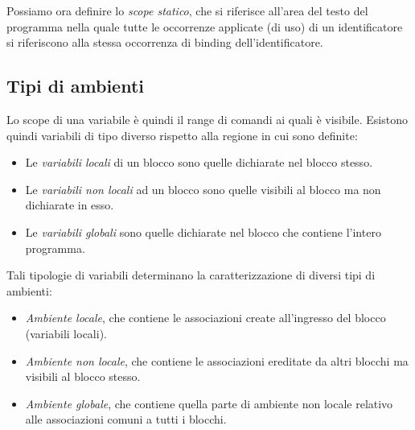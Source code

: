 \documentclass[a4paper,oneside,titlepage]{book}
\begin{document}
Possiamo ora definire lo \textit{scope statico}, che si riferisce all'area del testo del programma nella quale tutte le occorrenze applicate (di uso) di un identificatore si riferiscono alla stessa occorrenza di binding dell'identificatore.

\subsection{Tipi di ambienti}
Lo scope di una variabile è quindi il range di comandi ai quali è visibile. Esistono quindi variabili di tipo diverso rispetto alla regione in cui sono definite:
\begin{itemize}
	\item Le \textit{variabili locali} di un blocco sono quelle dichiarate nel blocco stesso.
	\item Le \textit{variabili non locali} ad un blocco sono quelle visibili al blocco ma non dichiarate in esso.
	\item Le \textit{variabili globali} sono quelle dichiarate nel blocco che contiene l'intero programma.
\end{itemize}
Tali tipologie di variabili determinano la caratterizzazione di diversi tipi di ambienti:
\begin{itemize}
	\item \textit{Ambiente locale}, che contiene le associazioni create all'ingresso del blocco (variabili locali).
	\item \textit{Ambiente non locale}, che contiene le associazioni ereditate da altri blocchi ma visibili al blocco stesso.
	\item \textit{Ambiente globale}, che contiene quella parte di ambiente non locale relativo alle associazioni comuni a tutti i blocchi.
\end{itemize}

\newpage
\end{document}
